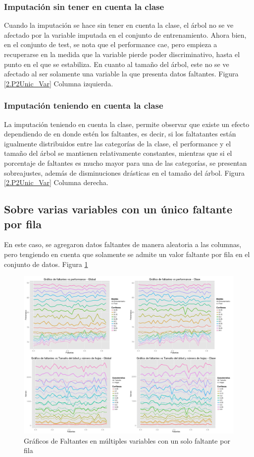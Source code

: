 \documentclass[]{article}
\begin{document}
\subsubsection{Imputación sin tener en cuenta la clase}
Cuando la imputación se hace sin tener en cuenta la clase, el árbol no se ve afectado por la variable imputada en el conjunto de entrenamiento. Ahora bien, en el conjunto de test, se nota que el performance cae, pero empieza a recuperarse en la medida que la variable pierde poder discriminativo, hasta el punto en el que se estabiliza. En cuanto al tamaño del árbol, este no se ve afectado al ser solamente una variable la que presenta datos faltantes. Figura \ref{2.P2Unic_Var} Columna izquierda.

\subsubsection{Imputación teniendo en cuenta la clase}
La imputación teniendo en cuenta la clase, permite observar que existe un efecto dependiendo de en donde estén los faltantes, es decir, si los faltatantes están igualmente distribuidos entre las categorías de la clase, el performance y el tamaño del árbol se mantienen relativamente constantes, mientras que si el porcentaje de faltantes es mucho mayor para una de las categorías, se presentan sobreajustes, además de disminuciones drásticas en el tamaño del árbol.
Figura \ref{2.P2Unic_Var} Columna derecha.

\subsection{Sobre varias variables con un único faltante por fila}
En este caso, se agregaron datos faltantes de manera aleatoria a las columnas, pero tengiendo en cuenta que solamente se admite un valor faltante por fila en el conjunto de datos. Figura \ref{2.P2MultVarUnicFil} 

\begin{figure}[H]
	\includegraphics[scale = 0.27]{2_1_Mult_Col_Unic_Fil}
	\caption[Faltantes Múltiple variable]{Gráficos de Faltantes en múltiples variables con un solo faltante por fila}
	\label{2.P2MultVarUnicFil}
\end{figure}
\end{document}
